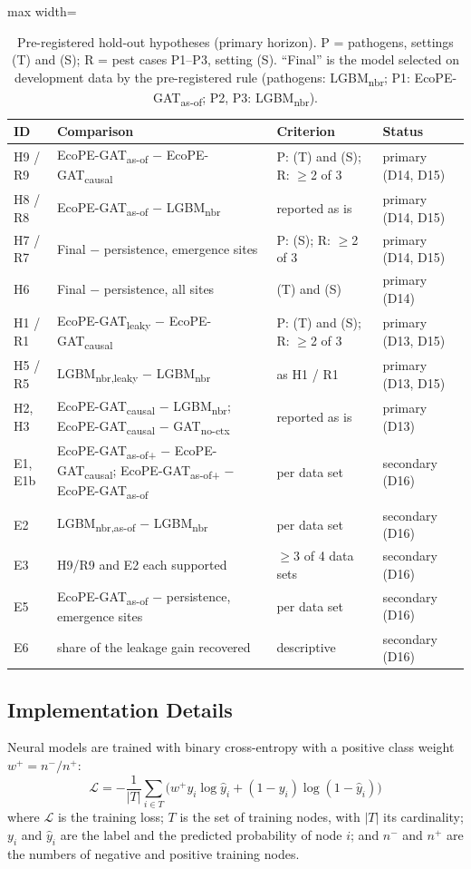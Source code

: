 \documentclass[a4paper,fleqn]{cas-sc}
\newcommand{\Masof}{\mbox{EcoPE-GAT\textsubscript{as-of}}}
\newcommand{\Masofplus}{\mbox{EcoPE-GAT\textsubscript{as-of+}}}
\newcommand{\Mcausal}{\mbox{EcoPE-GAT\textsubscript{causal}}}
\newcommand{\Mleaky}{\mbox{EcoPE-GAT\textsubscript{leaky}}}
\newcommand{\Mnoctx}{\mbox{GAT\textsubscript{no-ctx}}}
\newcommand{\Lnbr}{\mbox{LGBM\textsubscript{nbr}}}
\newcommand{\Lleaky}{\mbox{LGBM\textsubscript{nbr,leaky}}}
\newcommand{\Lasof}{\mbox{LGBM\textsubscript{nbr,as-of}}}
\begin{document}
\begin{table}[t]
\centering
\caption{Pre-registered hold-out hypotheses (primary horizon). P = pathogens, settings (T) and (S); R = pest cases P1--P3, setting (S). ``Final'' is the model selected on development data by the pre-registered rule (pathogens: \Lnbr; P1: \Masof; P2, P3: \Lnbr).}
\label{tab:hyp}
\small
\begin{adjustbox}{max width=\linewidth}
\begin{tabular}{llll}
\toprule
ID & Comparison & Criterion & Status \\
\midrule
H9 / R9 & \Masof{} $-$ \Mcausal & P: (T) and (S); R: $\geq$2 of 3 & primary (D14, D15) \\
H8 / R8 & \Masof{} $-$ \Lnbr & reported as is & primary (D14, D15) \\
H7 / R7 & Final $-$ persistence, emergence sites & P: (S); R: $\geq$2 of 3 & primary (D14, D15) \\
H6 & Final $-$ persistence, all sites & (T) and (S) & primary (D14) \\
H1 / R1 & \Mleaky{} $-$ \Mcausal & P: (T) and (S); R: $\geq$2 of 3 & primary (D13, D15) \\
H5 / R5 & \Lleaky{} $-$ \Lnbr & as H1 / R1 & primary (D13, D15) \\
H2, H3 & \Mcausal{} $-$ \Lnbr; \Mcausal{} $-$ \Mnoctx & reported as is & primary (D13) \\
E1, E1b & \Masofplus{} $-$ \Mcausal; \Masofplus{} $-$ \Masof & per data set & secondary (D16) \\
E2 & \Lasof{} $-$ \Lnbr & per data set & secondary (D16) \\
E3 & H9/R9 and E2 each supported & $\geq$3 of 4 data sets & secondary (D16) \\
E5 & \Masof{} $-$ persistence, emergence sites & per data set & secondary (D16) \\
E6 & share of the leakage gain recovered & descriptive & secondary (D16) \\
\bottomrule
\end{tabular}
\end{adjustbox}
\end{table}

\subsection{Implementation Details}

Neural models are trained with binary cross-entropy with a positive class weight $w^+ = n^-/n^+$:
\begin{equation}
\label{eq:loss}
\mathcal{L} = -\frac{1}{|T|}\sum_{i \in T}\Big( w^+ y_i \log \hat{y}_i + (1-y_i)\log(1-\hat{y}_i) \Big)
\end{equation}
where $\mathcal{L}$ is the training loss; $T$ is the set of training nodes, with $|T|$ its cardinality; $y_i$ and $\hat{y}_i$ are the label and the predicted probability of node $i$; and $n^-$ and $n^+$ are the numbers of negative and positive training nodes.
\end{document}
